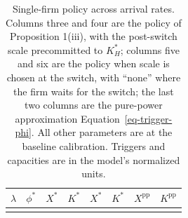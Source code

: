 \documentclass[
  11pt,
  letterpaper,
]{scrartcl}
\newcounter{none} %
\begin{document}
\begin{longtable}[]{@{}
  >{\raggedright\arraybackslash}p{}
  >{\raggedleft\arraybackslash}p{}
  >{\raggedleft\arraybackslash}p{}
  >{\raggedleft\arraybackslash}p{}
  >{\raggedleft\arraybackslash}p{}
  >{\raggedleft\arraybackslash}p{}
  >{\raggedleft\arraybackslash}p{}
  >{\raggedleft\arraybackslash}p{}@{}}
\caption{Single-firm policy across arrival rates. Columns three and four
are the policy of Proposition 1(iii), with the post-switch scale
precommitted to \(K_H^*\); columns five and six are the policy when
scale is chosen at the switch, with ``none'' where the firm waits for
the switch; the last two columns are the pure-power approximation
Equation~\ref{eq-trigger-phi}. All other parameters are at the baseline
calibration. Triggers and capacities are in the model's normalized
units.}\label{tbl-beliefs}\tabularnewline
\toprule\noalign{}
\begin{minipage}[b]{\linewidth}\raggedright
\(\lambda\)
\end{minipage} & \begin{minipage}[b]{\linewidth}\raggedleft
\(\phi^*\)
\end{minipage} & \begin{minipage}[b]{\linewidth}\raggedleft
\(X^*\)
\end{minipage} & \begin{minipage}[b]{\linewidth}\raggedleft
\(K^*\)
\end{minipage} & \begin{minipage}[b]{\linewidth}\raggedleft
\(X^*\)
\end{minipage} & \begin{minipage}[b]{\linewidth}\raggedleft
\(K^*\)
\end{minipage} & \begin{minipage}[b]{\linewidth}\raggedleft
\(X^{\text{pp}}\)
\end{minipage} & \begin{minipage}[b]{\linewidth}\raggedleft
\(K^{\text{pp}}\)
\end{minipage} \\
\midrule\noalign{}
\endfirsthead
\toprule\noalign{}
\begin{minipage}[b]{\linewidth}\raggedright

\end{minipage}
\end{longtable}
\end{document}
